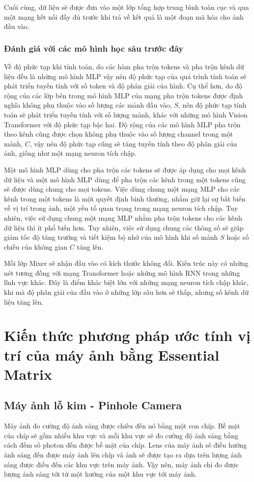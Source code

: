 Cuối cùng, dữ liệu sẽ được đưa vào một lớp tổng hợp trung bình toàn cục và qua một mạng kết nối đầy đủ trước khi trả về kết quả là một đoạn mã hóa cho ảnh đầu vào.

\subsubsection*{Đánh giá với các mô hình học sâu trước đây}
Về độ phức tạp khi tính toán, do các hàm pha trộn tokens và pha trộn kênh dữ liệu đều là những mô hình MLP vậy nên độ phức tạp của quá trình tính toán sẽ phát triển tuyến tính với số token và độ phân giải của hình. Cụ thể hơn, do độ rộng của các lớp bên trong mô hình MLP của mạng pha trộn tokens được định nghĩa không phụ thuộc vào số lượng các mảnh đầu vào, $S$, nên độ phức tạp tính toán sẽ phát triển tuyến tính với số lượng mảnh, khác với những mô hình Vision Transformer với độ phức tạp bậc hai. Độ rộng của các mô hình MLP pha trộn theo kênh cũng được chọn không phụ thuộc vào số lượng channel trong một mảnh, $C$, vậy nên độ phức tạp cũng sẽ tăng tuyến tính theo độ phân giải của ảnh, giống như một mạng neuron tích chập.

Một mô hình MLP dùng cho pha trộn các tokens sẽ được áp dụng cho mọi kênh dữ liệu và một mô hình MLP dùng để pha trộn các kênh trong một tokens cũng sẽ được dùng chung cho mọi tokens. Việc dùng chung một mạng MLP cho các kênh trong một tokens là một quyết định bình thường, nhằm giữ lại sự bất biến về vị trí trong ảnh, một yếu tố quan trọng trong mạng neuron tích chập. Tuy nhiên, việc sử dụng chung một mạng MLP nhằm pha trộn tokens cho các kênh dữ liệu thì ít phổ biến hơn. Tuy nhiên, việc sử dụng chung các thông số sẽ giúp giảm tốc độ tăng trưởng và tiết kiệm bộ nhớ của mô hình khi số mảnh $S$ hoặc số chiều của không gian $C$ tăng lên.

Mỗi lớp Mixer sẽ nhận đầu vào có kích thước không đổi. Kiến trúc này có những nét tương đồng với mạng Transformer hoặc những mô hình RNN trong những lĩnh vực khác. Đây là điểm khác biệt lớn với những mạng neuron tích chập khác, khi mà độ phân giải của đầu vào ở những lớp sâu hơn sẽ thấp, nhưng số kênh dữ liệu tăng lên.


\section{Kiến thức phương pháp ước tính vị trí của máy ảnh bằng Essential Matrix}
\subsection{Máy ảnh lỗ kim - Pinhole Camera}
Máy ảnh đo cường độ ánh sáng được chiếu đến nó bằng một con chíp. Bề mặt của chíp sẽ gồm nhiều khu vực và mỗi khu vực sẽ đo cường độ ánh sáng bằng cách đếm số photon đến được bề mặt của chíp. Lens của máy ảnh sẽ điều hướng ánh sáng đến được máy ảnh lên chíp và ảnh sẽ được tạo ra dựa trên lượng ánh sáng được điều đến các khu vực trên máy ảnh. Vậy nên, máy ảnh chỉ đo được lượng ánh sáng tới từ một hướng của một khu vực tới máy ảnh.


